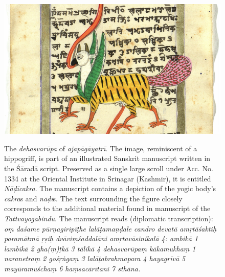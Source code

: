   \begin{figure}[ht]
	\centering
  \includegraphics[width=1\textwidth]{pics/Wolpertinger.png}
\caption[The \textit{dehasvarūpa} of \textit{ajapāgāyatrī}]{The \textit{dehasvarūpa} of \textit{ajapāgāyatrī}. The image, reminiscent of a hippogriff, is part of an illustrated Sanskrit manuscript written in the Śāradā script. Preserved as a single large scroll under Acc. No. 1334 at the Oriental Institute in Srinagar (Kashmir), it is entitled \textit{Nāḍīcakra}. The manuscript contains a depiction of the yogic body’s \textit{cakra}s and \textit{nāḍī}s. The text surrounding the figure closely corresponds to the additional material found in manuscript  of the \textit{Tattvayogabindu}. The manuscript reads (diplomatic transcription): \textit{oṃ daśame pūrṇagiripīṭhe lalāṭamaṇḍale candro devatā amṛtāśaktiḥ paramātmā ṛṣiḥ dvāviṃśaddalāni amṛtavāsinikalā 4: ambikā 1 lambikā 2 gha(ṃ)ṭkā 3 tālikā 4 dehasvarūpaṃ kākamukhaṃ 1 naranetraṃ 2 gośṛṅgaṃ 3 lalāṭabrahmapara 4 hayagrīvā 5 mayūramuśchaṃ 6 haṃsacārītani 7 sthāna.}}
	\label{fig_wolpertinger}
      \end{figure}

      \clearpage

